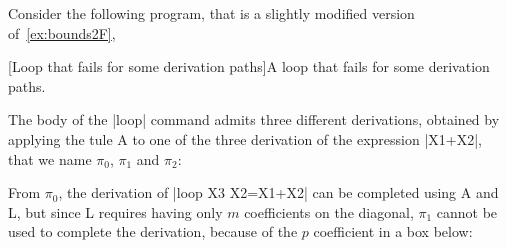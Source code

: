 \begin{example}\label{ex:partial}
Consider the following program, that is a slightly modified version of~\autoref{ex:bounds2F},

\captionsetup{type=lstlisting}
[Loop that fails for some derivation paths]{A loop that fails for some derivation paths.}
\label{lst:partial-fail}

The body of the \pr|loop| command admits three different derivations,
obtained by applying the tule A to one of the three derivation of the expression
\pr|X1+X2|, that we name \(\pi_0\), \(\pi_1\) and \(\pi_2\):

\begin{center}
\hfill
{}
\hfill
{}
\end{center}

From \(\pi_0\), the derivation of  \pr|loop X3 {X2=X1+X2}| can be
completed using A and L, but since L requires having only \(m\) coefficients
on the diagonal, \(\pi_1\) cannot be used to complete the derivation,
because of the \(p\) coefficient in a box below:


\end{example}
